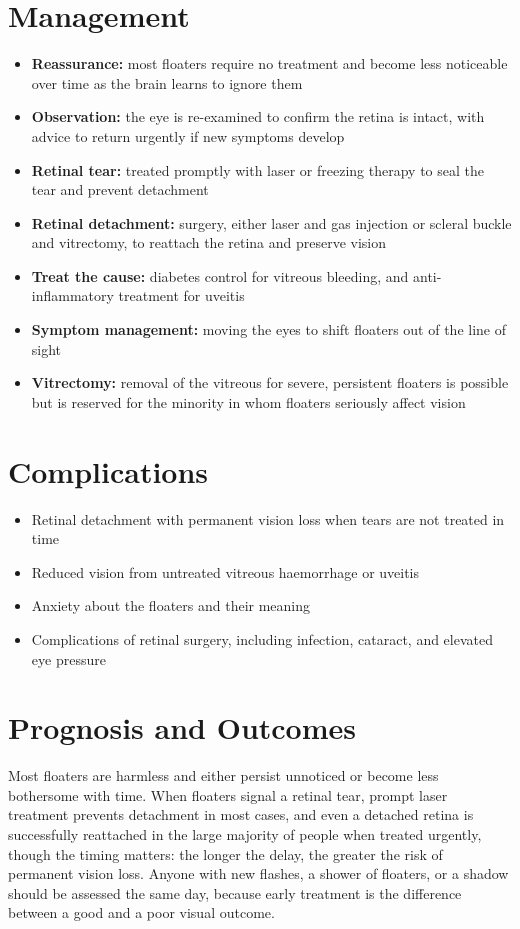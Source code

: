 \section*{Management}
\begin{itemize}
    \item \textbf{Reassurance:} most floaters require no treatment and become less noticeable over time as the brain learns to ignore them
    \item \textbf{Observation:} the eye is re-examined to confirm the retina is intact, with advice to return urgently if new symptoms develop
    \item \textbf{Retinal tear:} treated promptly with laser or freezing therapy to seal the tear and prevent detachment
    \item \textbf{Retinal detachment:} surgery, either laser and gas injection or scleral buckle and vitrectomy, to reattach the retina and preserve vision
    \item \textbf{Treat the cause:} diabetes control for vitreous bleeding, and anti-inflammatory treatment for uveitis
    \item \textbf{Symptom management:} moving the eyes to shift floaters out of the line of sight
    \item \textbf{Vitrectomy:} removal of the vitreous for severe, persistent floaters is possible but is reserved for the minority in whom floaters seriously affect vision
\end{itemize}

\section*{Complications}
\begin{itemize}
    \item Retinal detachment with permanent vision loss when tears are not treated in time
    \item Reduced vision from untreated vitreous haemorrhage or uveitis
    \item Anxiety about the floaters and their meaning
    \item Complications of retinal surgery, including infection, cataract, and elevated eye pressure
\end{itemize}

\section*{Prognosis and Outcomes}
Most floaters are harmless and either persist unnoticed or become less bothersome with time. When floaters signal a retinal tear, prompt laser treatment prevents detachment in most cases, and even a detached retina is successfully reattached in the large majority of people when treated urgently, though the timing matters: the longer the delay, the greater the risk of permanent vision loss. Anyone with new flashes, a shower of floaters, or a shadow should be assessed the same day, because early treatment is the difference between a good and a poor visual outcome.

